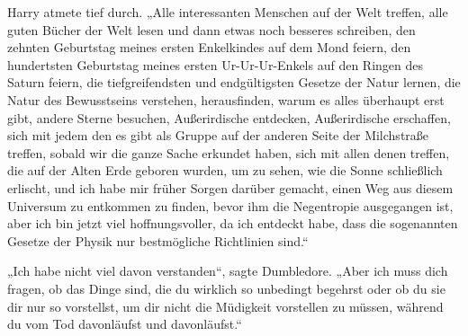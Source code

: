 Harry atmete tief durch. „Alle interessanten Menschen auf der Welt treffen, alle guten Bücher der Welt lesen und dann etwas noch besseres schreiben, den zehnten Geburtstag meines ersten Enkelkindes auf dem Mond feiern, den hundertsten Geburtstag meines ersten Ur-Ur-Ur-Enkels auf den Ringen des Saturn feiern, die tiefgreifendsten und endgültigsten Gesetze der Natur lernen, die Natur des Bewusstseins verstehen, herausfinden, warum es alles überhaupt erst gibt, andere Sterne besuchen, Außerirdische entdecken, Außerirdische erschaffen, sich mit jedem den es gibt als Gruppe auf der anderen Seite der Milchstraße treffen, sobald wir die ganze Sache erkundet haben, sich mit allen denen treffen, die auf der Alten Erde geboren wurden, um zu sehen, wie die Sonne schließlich erlischt, und ich habe mir früher Sorgen darüber gemacht, einen Weg aus diesem Universum zu entkommen zu finden, bevor ihm die Negentropie ausgegangen ist, aber ich bin jetzt viel hoffnungsvoller, da ich entdeckt habe, dass die sogenannten Gesetze der Physik nur bestmögliche Richtlinien sind.“%

„Ich habe nicht viel davon verstanden“, sagte Dumbledore. „Aber ich muss dich fragen, ob das Dinge sind, die du wirklich so unbedingt begehrst oder ob du sie dir nur so vorstellst, um dir nicht die Müdigkeit vorstellen zu müssen, während du vom Tod davonläufst und davonläufst.“

